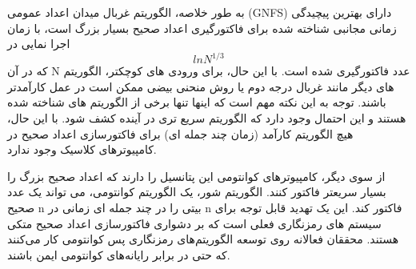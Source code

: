 \documentclass{article}
\begin{document}
به طور خلاصه، الگوریتم غربال میدان اعداد عمومی (GNFS) دارای بهترین پیچیدگی زمانی مجانبی شناخته شده برای فاکتورگیری اعداد صحیح بسیار بزرگ است، با زمان اجرا نمایی در 
\[lnN^{1/3}\]
 که در آن N عدد فاکتورگیری شده است. با این حال، برای ورودی های کوچکتر، الگوریتم های دیگر مانند غربال درجه دوم یا روش منحنی بیضی ممکن است در عمل کارآمدتر باشند.
توجه به این نکته مهم است که اینها تنها برخی از الگوریتم های شناخته شده هستند و این احتمال وجود دارد که الگوریتم سریع تری در آینده کشف شود. با این حال، هیچ الگوریتم کارآمد (زمان چند جمله ای) برای فاکتورسازی اعداد صحیح در کامپیوترهای کلاسیک وجود ندارد.

از سوی دیگر، کامپیوترهای کوانتومی این پتانسیل را دارند که اعداد صحیح بزرگ را بسیار سریعتر فاکتور کنند. الگوریتم شور، یک الگوریتم کوانتومی، می تواند یک عدد صحیح n بیتی را در چند جمله ای زمانی در n فاکتور کند. این یک تهدید قابل توجه برای سیستم های رمزنگاری فعلی است که بر دشواری فاکتورسازی اعداد صحیح متکی هستند. محققان فعالانه روی توسعه الگوریتم‌های رمزنگاری پس کوانتومی کار می‌کنند که حتی در برابر رایانه‌های کوانتومی ایمن باشند.
\\\\
\end{document}
